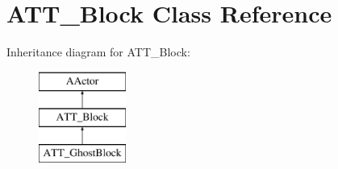 \hypertarget{class_a_t_t___block}{}\section{A\+T\+T\+\_\+\+Block Class Reference}
\label{class_a_t_t___block}
Inheritance diagram for A\+T\+T\+\_\+\+Block\+:\begin{figure}[H]
\begin{center}
\leavevmode
\includegraphics[height=3.000000cm]{class_a_t_t___block}
\end{center}
\end{figure}
